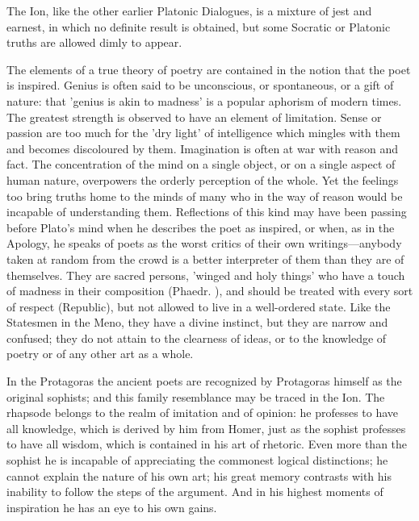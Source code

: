 \documentclass[11pt,letter]{article}
\begin{document}
\par  The Ion, like the other earlier Platonic Dialogues, is a mixture of jest and earnest, in which no definite result is obtained, but some Socratic or Platonic truths are allowed dimly to appear.

\par  The elements of a true theory of poetry are contained in the notion that the poet is inspired. Genius is often said to be unconscious, or spontaneous, or a gift of nature: that 'genius is akin to madness' is a popular aphorism of modern times. The greatest strength is observed to have an element of limitation. Sense or passion are too much for the 'dry light' of intelligence which mingles with them and becomes discoloured by them. Imagination is often at war with reason and fact. The concentration of the mind on a single object, or on a single aspect of human nature, overpowers the orderly perception of the whole. Yet the feelings too bring truths home to the minds of many who in the way of reason would be incapable of understanding them. Reflections of this kind may have been passing before Plato's mind when he describes the poet as inspired, or when, as in the Apology, he speaks of poets as the worst critics of their own writings—anybody taken at random from the crowd is a better interpreter of them than they are of themselves. They are sacred persons, 'winged and holy things' who have a touch of madness in their composition (Phaedr. ), and should be treated with every sort of respect (Republic), but not allowed to live in a well-ordered state. Like the Statesmen in the Meno, they have a divine instinct, but they are narrow and confused; they do not attain to the clearness of ideas, or to the knowledge of poetry or of any other art as a whole.

\par  In the Protagoras the ancient poets are recognized by Protagoras himself as the original sophists; and this family resemblance may be traced in the Ion. The rhapsode belongs to the realm of imitation and of opinion: he professes to have all knowledge, which is derived by him from Homer, just as the sophist professes to have all wisdom, which is contained in his art of rhetoric. Even more than the sophist he is incapable of appreciating the commonest logical distinctions; he cannot explain the nature of his own art; his great memory contrasts with his inability to follow the steps of the argument. And in his highest moments of inspiration he has an eye to his own gains.
\end{document}
